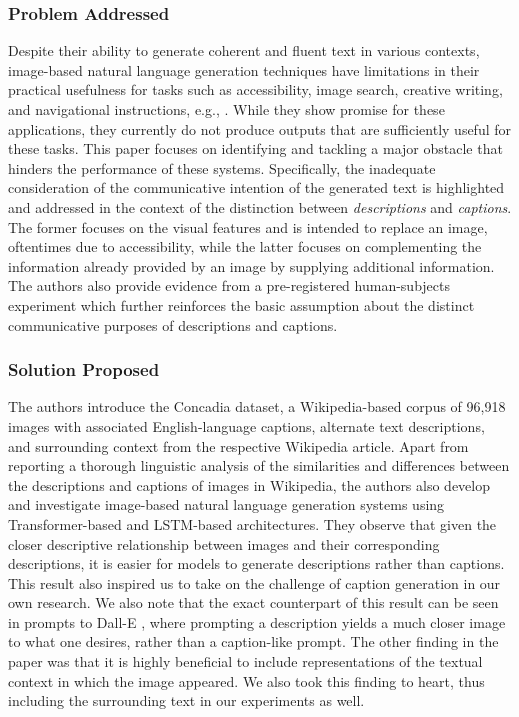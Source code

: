 \documentclass[11pt]{article}
\begin{document}
\subsubsection{Problem Addressed}

Despite their ability to generate coherent and fluent text in various contexts, image-based natural language generation techniques have limitations in their practical usefulness for tasks such as accessibility, image search, creative writing, and navigational instructions, e.g., \citep{dognin2019adversarial, Guinness2018, gurari2020captioning}. While they show promise for these applications, they currently do not produce outputs that are sufficiently useful for these tasks. This paper focuses on identifying and tackling a major obstacle that hinders the performance of these systems. Specifically, the inadequate consideration of the communicative intention of the generated text is highlighted and addressed in the context of the distinction between \textit{descriptions} and \textit{captions}. The former focuses on the visual features and is intended to replace an image, oftentimes due to accessibility, while the latter focuses on complementing the information already provided by an image by supplying additional information. The authors also provide evidence from a pre-registered human-subjects experiment which further reinforces the basic assumption about the distinct communicative purposes of descriptions and captions.

\subsubsection{Solution Proposed}

The authors introduce the Concadia dataset, a Wikipedia-based corpus of 96,918 images with associated English-language captions, alternate text descriptions, and surrounding context from the respective Wikipedia article. Apart from reporting a thorough linguistic analysis of the similarities and differences between the descriptions and captions of images in Wikipedia, the authors also develop and investigate image-based natural language generation systems using Transformer-based and LSTM-based architectures. They observe that given the closer descriptive relationship between images and their corresponding descriptions, it is easier for models to generate descriptions rather than captions. This result also inspired us to take on the challenge of caption generation in our own research. We also note that the exact counterpart of this result can be seen in prompts to Dall-E \cite{ramesh2021zeroshot}, where prompting a description yields a much closer image to what one desires, rather than a caption-like prompt. The other finding in the \cite{kreiss2021concadia} paper was that it is highly beneficial to include representations of the textual context in which the image appeared. We also took this finding to heart, thus including the surrounding text in our experiments as well.
\end{document}
